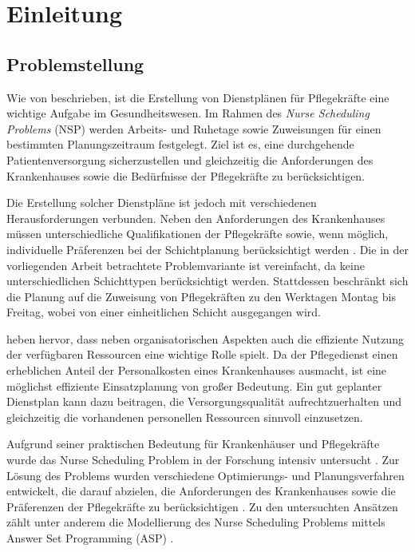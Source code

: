 \chapter{Einleitung}
\label{sec:introduction}


\section{Problemstellung}
\label{sec:introduction:motivation}

Wie von \textcite{alvianoNurseReschedulingAnswer2019} beschrieben, ist die Erstellung von Dienstplänen für Pflegekräfte eine wichtige Aufgabe im Gesundheitswesen. Im Rahmen des \textit{Nurse Scheduling Problems} (NSP) werden Arbeits- und Ruhetage sowie Zuweisungen für einen bestimmten Planungszeitraum festgelegt. Ziel ist es, eine durchgehende Patientenversorgung sicherzustellen und gleichzeitig die Anforderungen des Krankenhauses sowie die Bedürfnisse der Pflegekräfte zu berücksichtigen.

Die Erstellung solcher Dienstpläne ist jedoch mit verschiedenen Herausforderungen verbunden. Neben den Anforderungen des Krankenhauses müssen unterschiedliche Qualifikationen der Pflegekräfte sowie, wenn möglich, individuelle Präferenzen bei der Schichtplanung berücksichtigt werden \parencite{ayoughiDragonflyAlgorithmApplication2024}. Die in der vorliegenden Arbeit betrachtete Problemvariante ist vereinfacht, da keine unterschiedlichen Schichttypen berücksichtigt werden. Stattdessen beschränkt sich die Planung auf die Zuweisung von Pflegekräften zu den Werktagen Montag bis Freitag, wobei von einer einheitlichen Schicht ausgegangen wird.

\textcite{Oughalime2008} heben hervor, dass neben organisatorischen Aspekten auch die effiziente Nutzung der verfügbaren Ressourcen eine wichtige Rolle spielt. Da der Pflegedienst einen erheblichen Anteil der Personalkosten eines Krankenhauses ausmacht, ist eine möglichst effiziente Einsatzplanung von großer Bedeutung. Ein gut geplanter Dienstplan kann dazu beitragen, die Versorgungsqualität aufrechtzuerhalten und gleichzeitig die vorhandenen personellen Ressourcen sinnvoll einzusetzen.

Aufgrund seiner praktischen Bedeutung für Krankenhäuser und Pflegekräfte wurde das Nurse Scheduling Problem in der Forschung intensiv untersucht \parencite{alvianoNurseReschedulingAnswer2019}. Zur Lösung des Problems wurden verschiedene Optimierungs- und Planungsverfahren entwickelt, die darauf abzielen, die Anforderungen des Krankenhauses sowie die Präferenzen der Pflegekräfte zu berücksichtigen \parencite{ayoughiDragonflyAlgorithmApplication2024}. Zu den untersuchten Ansätzen zählt unter anderem die Modellierung des Nurse Scheduling Problems mittels Answer Set Programming (ASP) \parencite{alvianoNurseReschedulingAnswer2019}.


